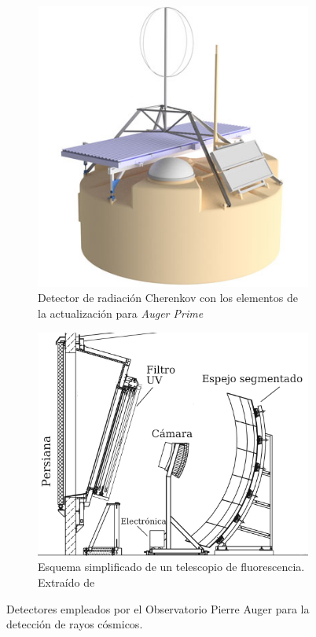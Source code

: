 \begin{figure}[H]
    \begin{subfigure}[t]{0.45\textwidth}
	\includegraphics[width=\textwidth]{tanque.png}
	\caption{Detector de radiación Cherenkov con los elementos de la actualización para \emph{Auger Prime}} 	\label{fig:tanque}
    \end{subfigure}%
    \hspace{\fill}
    \begin{subfigure}[t]{0.5\textwidth}
	\includegraphics[width=\textwidth]{fd.png}
	\caption{Esquema simplificado de un telescopio de fluorescencia. Extraído de \cite{kit_oracle}}
	\label{fig:FD}
    \end{subfigure}%
    \caption{Detectores empleados por el Observatorio Pierre Auger para la detección de rayos cósmicos.}
	\end{figure}

